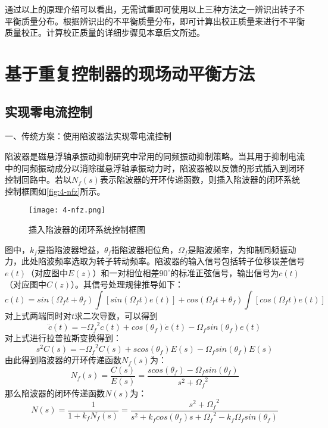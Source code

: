 \documentclass[
  lang=cn,
  degree=master,
  openany,oneside
]{nuaathesis}
\begin{document}
通过以上的原理介绍可以看出，无需试重即可使用以上三种方法之一辨识出转子不平衡质量分布。根据辨识出的不平衡质量分布，即可计算出校正质量来进行不平衡质量校正。计算校正质量的详细步骤见本章后文所述。

\section{基于重复控制器的现场动平衡方法}

\subsection{实现零电流控制}

一、传统方案：使用陷波器法实现零电流控制

陷波器是磁悬浮轴承振动抑制研究中常用的同频振动抑制策略。当其用于抑制电流中的同频振动成分以消除磁悬浮轴承振动力时，陷波器被以反馈的形式插入到闭环控制回路中。若以$N_f(s)$表示陷波器的开环传递函数，则插入陷波器的闭环系统控制框图如\autoref{fig:4-nfz}所示。

\begin{figure}
	\texttt{[image: 4-nfz.png]}
	\caption{插入陷波器的闭环系统控制框图}
	\label{fig:4-nfz}
\end{figure}

图中，$k_f$是指陷波器增益，$\theta _f$指陷波器相位角，$\Omega _f$是陷波频率，为抑制同频振动力，此处陷波频率选取为转子转动频率。陷波器的输入信号包括转子位移误差信号$e(t)$（对应图中$E(z)$）和一对相位相差$90^{\circ}$的标准正弦信号，输出信号为$c(t)$（对应图中$C(z)$）。其信号处理规律推导如下：
\begin{equation}
c(t) = sin({\Omega}_f t + \theta _f) \int [sin({\Omega}_f t)e(t)]+cos({\Omega}_f t + \theta _f) \int [cos({\Omega}_f t)e(t)]
\end{equation}
对上式两端同时对$t$求二次导数，可以得到
\begin{equation}
\ddot{c}(t) = -{{\Omega}_f}^2c(t)+cos(\theta _f)\dot{e}(t)-{\Omega}_f sin(\theta _f)e(t)
\end{equation}
对上式进行拉普拉斯变换得到：
\begin{equation}
s^2C(s) = -{{\Omega}_f}^2C(s)+scos(\theta _f)E(s)-{\Omega}_f sin(\theta _f)E(s)
\end{equation}
由此得到陷波器的开环传递函数$N_f(s)$为：
\begin{equation}
N_f(s) = \frac{C(s)}{E(s)} = \frac{scos(\theta _f) - {\Omega}_f sin(\theta _f)}{s^2 + {{\Omega}_f}^2}
\end{equation}
那么陷波器的闭环传递函数$N(s)$为：
\begin{equation}
N(s) = \frac{1}{1+k_fN_f(s)}=\frac{s^2+{{\Omega}_f}^2}{s^2+k_fcos(\theta _f)s + {{\Omega}_f}^2-k_f{\Omega}_f sin(\theta _f)}
\end{equation}
\end{document}
